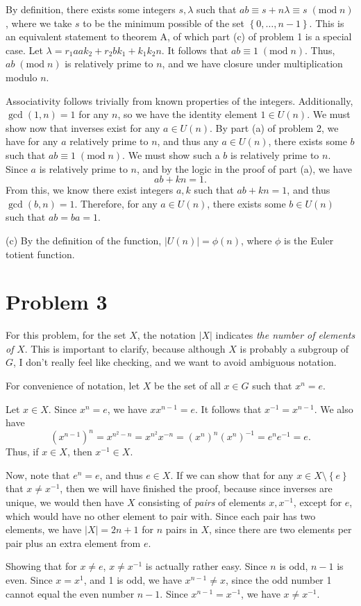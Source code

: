 \documentclass[11pt, letterpaper]{report}
\renewcommand{\mod}[1]{\;(\text{mod}\;#1)}
\renewenvironment{solution}[1][]{\begin{setsolution}}{\end{setsolution}}
\begin{document}
\begin{solution}
By definition, there exists some integers $s,\lambda $ such that $ab\equiv s+n\lambda \equiv s \mod{n}$, where we take $s$ to be the minimum possible of the set $\left\{ 0,\ldots,n-1 \right\} $. This is an equivalent statement to theorem A, of which part (c) of problem 1 is a special case. Let $\lambda =r_1aak_2+r_2bk_1+k_1k_2n$. It follows that $ab\equiv 1\mod{n}$. Thus, $ab\mod{n}$ is relatively prime to $n$, and we have closure under multiplication modulo $n$.

Associativity follows trivially from known properties of the integers. Additionally, $\operatorname{gcd}(1,n) =1$ for any $n$, so we have the identity element $1\in U(n)$. We must show now that inverses exist for any $a\in U(n)$. By part (a) of problem 2, we have for any $a$ relatively prime to $n$, and thus any $a\in U(n)$, there exists some $b$ such that $ab\equiv 1\mod{n}$. We must show such a $b$ is relatively prime to $n $. Since $a$ is relatively prime to $n$, and by the logic in the proof of part (a), we have
\[
	ab+kn=1
.\]
From this, we know there exist integers $a,k$ such that $ab+kn=1$, and thus $\operatorname{gcd}(b,n) =1$. Therefore, for any $a\in U(n)$, there exists some $b\in U(n)$ such that $ab=ba=1$.

(c) By the definition of the function, $\left| U(n) \right| =\phi (n)$, where $\phi $ is the Euler totient function.
\end{solution}
\section*{Problem 3}
For this problem, for the set $X$, the notation $\left| X \right| $ indicates \emph{the number of elements of} $X$. This is important to clarify, because although $X$ is probably a subgroup of $G$, I don't really feel like checking, and we want to avoid ambiguous notation.
\begin{solution}
	For convenience of notation, let $X$ be the set of all $x\in G$ such that $x^n=e$.

	Let $x\in X$. Since $x^n=e$, we have $xx^{n-1}=e$. It follows that $x ^{-1}=x^{n-1}$. We also have
	\[
		\left( x^{n-1} \right) ^n = x^{n^2-n}=x^{n^2}x^{-n}=\left( x^n \right) ^n \left( x ^{n} \right) ^{-1} = e^n e^{-1}=e
	.\]
	Thus, if $x\in X$, then $x ^{-1}\in X$.

	Now, note that $e^n = e$, and thus $e\in X$. If we can show that for any $x\in X\setminus\left\{ e \right\} $ that $x\neq x ^{-1}$, then we will have finished the proof, because since inverses are unique, we would then have $X$ consisting of \emph{pairs} of elements $x,x ^{-1}$, except for $e$, which would have no other element to pair with. Since each pair has two elements, we have $\left| X \right| =2n+1$ for $n$ pairs in $X$, since there are two elements per pair plus an extra element from $e$.

	Showing that for $x\neq e$, $x \neq x ^{-1}$ is actually rather easy. Since $n$ is odd, $n-1$ is even. Since $x=x^1$, and 1 is odd, we have $x^{n-1} \neq x$, since the odd number 1 cannot equal the even number $n-1$. Since $x^{n-1}= x ^{-1}$, we have $x \neq x ^{-1}$.
\end{solution}
\end{document}
